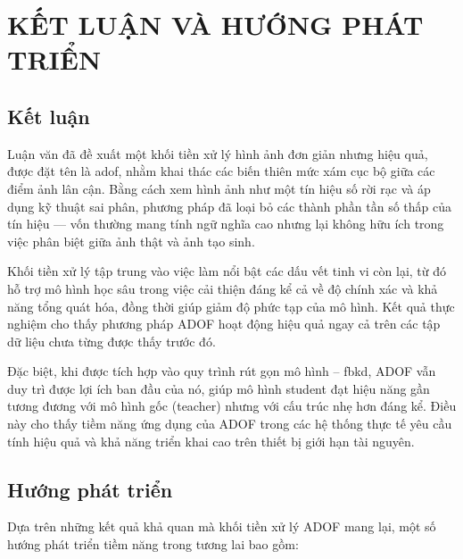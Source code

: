 \chapter{KẾT LUẬN VÀ HƯỚNG PHÁT TRIỂN}

\section{Kết luận}
Luận văn đã đề xuất một khối tiền xử lý hình ảnh đơn giản nhưng hiệu quả, được đặt tên là \gls{adof}, nhằm khai thác các biến thiên mức xám cục bộ giữa các điểm ảnh lân cận. Bằng cách xem hình ảnh như một tín hiệu số rời rạc và áp dụng kỹ thuật sai phân, phương pháp đã loại bỏ các thành phần tần số thấp của tín hiệu — vốn thường mang tính ngữ nghĩa cao nhưng lại không hữu ích trong việc phân biệt giữa ảnh thật và ảnh tạo sinh.

Khối tiền xử lý tập trung vào việc làm nổi bật các dấu vết tinh vi còn lại, từ đó hỗ trợ mô hình học sâu trong việc cải thiện đáng kể cả về độ chính xác và khả năng tổng quát hóa, đồng thời giúp giảm độ phức tạp của mô hình. Kết quả thực nghiệm cho thấy phương pháp ADOF hoạt động hiệu quả ngay cả trên các tập dữ liệu chưa từng được thấy trước đó.

Đặc biệt, khi được tích hợp vào quy trình rút gọn mô hình -- \gls{fbkd}, ADOF vẫn duy trì được lợi ích ban đầu của nó, giúp mô hình \gls{student} đạt hiệu năng gần tương đương với mô hình gốc (\gls{teacher}) nhưng với cấu trúc nhẹ hơn đáng kể. Điều này cho thấy tiềm năng ứng dụng của ADOF trong các hệ thống thực tế yêu cầu tính hiệu quả và khả năng triển khai cao trên thiết bị giới hạn tài nguyên.

\section{Hướng phát triển}
Dựa trên những kết quả khả quan mà khối tiền xử lý ADOF mang lại, một số hướng phát triển tiềm năng trong tương lai bao gồm:

